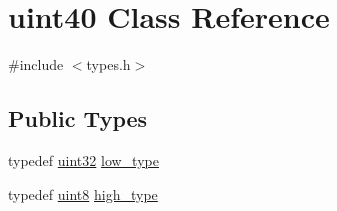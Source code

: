 \hypertarget{classuint40}{}\section{uint40 Class Reference}
\label{classuint40}


{\ttfamily \#include $<$types.\+h$>$}

\subsection*{Public Types}
\begin{DoxyCompactItemize}
\item 
typedef \hyperlink{types_8h_a8f95e75e58492e87412191fabadd8ca8}{uint32} \hyperlink{classuint40_a92fb8d876ca5cf77d4ed86dae0adc2f2}{low\+\_\+type}
\item 
typedef \hyperlink{types_8h_a115946cb5fc5879545e9ccea096a6031}{uint8} \hyperlink{classuint40_a58afcd6aeb1ea1e103b8e85eb6aefec4}{high\+\_\+type}
\end{DoxyCompactItemize}
